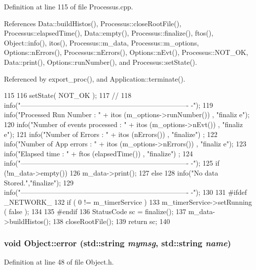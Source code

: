 Definition at line 115 of file Processus.cpp.

References Data::buildHistos(), Processus::closeRootFile(), Processus::elapsedTime(), Data::empty(), Processus::finalize(), ftos(), Object::info(), itos(), Processus::m\_\-data, Processus::m\_\-options, Options::nErrors(), Processus::nErrors(), Options::nEvt(), Processus::NOT\_\-OK, Data::print(), Options::runNumber(), and Processus::setState().

Referenced by export\_\-proc(), and Application::terminate().


\begin{DoxyCode}
115                                     {
116   setState( NOT_OK );
117   // 
118   info("-------------------------------------------------------------------------
      -");
119   info("Processed Run Number       : " + itos (m_options->runNumber()) , "finaliz
      e");
120   info("Number of events processed : " + itos (m_options->nEvt())      , "finaliz
      e");
121   info("Number of Errors           : " + itos (nErrors())           , "finalize")
      ;  
122   info("Number of App errors       : " + itos (m_options->nErrors())   , "finaliz
      e");
123   info("Elapsed time               : " + ftos (elapsedTime())       , "finalize")
      ;
124   info("-------------------------------------------------------------------------
      -");
125   if (!m_data->empty()) 
126     m_data->print();
127   else 
128     info("No data Stored.","finalize");
129   info("-------------------------------------------------------------------------
      -");
130 
131 #ifdef _NETWORK_
132   if ( 0 != m_timerService ){
133     m_timerService->setRunning ( false );
134   }
135 #endif
136   StatusCode sc = finalize();
137   m_data->buildHistos();  
138   closeRootFile();
139   return sc;
140 }
\end{DoxyCode}
\hypertarget{classObject_ad7f6c457733082efa2f9ff5f5c8e119a}{
\subsubsection[{error}]{\setlength{\rightskip}{0pt plus 5cm}void Object::error (std::string {\em mymsg}, \/  std::string {\em name})}}
\label{classObject_ad7f6c457733082efa2f9ff5f5c8e119a}


Definition at line 48 of file Object.h.

